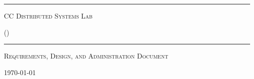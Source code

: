 %

\begin{titlepage}
\begin{center}

\rule{\linewidth}{0.5mm}

\textsc{\large CC Distributed Systems Lab}
~\\[1cm]

{\Huge \linespread{2}\sc{\longname}}

\vspace{10pt}

\textsc{\Large (\acronym)}

\rule{\linewidth}{0.5mm}

\vfill

\textsc{\Large Requirements, Design, and Administration Document}


\vfill
{\large \today}

\end{center}
\end{titlepage}
